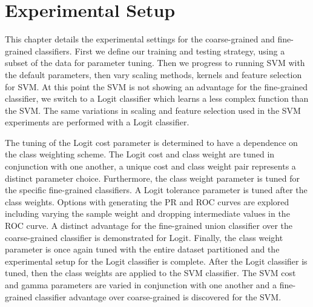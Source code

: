 \documentclass[ms]{nuthesis}
\begin{document}
\chapter{Experimental Setup}
\par This chapter details the experimental settings for the coarse-grained and fine-grained classifiers. First we
 define our training and testing strategy, using a subset of the data for parameter tuning.
 Then we progress to running SVM with the default parameters, then
 vary scaling methods, kernels and feature selection for SVM. At this point the SVM is not showing an advantage for
 the fine-grained classifier, we switch to a Logit classifier which learns a less complex
 function than the SVM. The same
 variations in scaling and feature selection used in the SVM experiments are performed with a Logit classifier.
 \par The tuning of the Logit cost parameter is determined to have a dependence on the class weighting scheme. The Logit
  cost and class weight are tuned in conjunction with one another, a unique cost and class weight pair represents
  a distinct parameter choice. Furthermore, the
 class weight parameter is tuned for the specific fine-grained classifiers. A Logit tolerance parameter is tuned
 after the class weights. Options with generating the PR and ROC curves are explored including varying the sample weight
 and dropping intermediate values in the ROC curve. A distinct advantage for the fine-grained union classifier over the
 coarse-grained classifier is demonstrated for Logit. Finally, the class weight parameter is once again tuned with
 the entire dataset partitioned and the experimental setup for the Logit classifier is complete. After the Logit classifier
 is tuned, then the class weights are applied to the SVM classifier. The SVM cost and
  gamma parameters are varied in conjunction with one another
  and a fine-grained classifier advantage over coarse-grained is discovered for the SVM.
\end{document}
